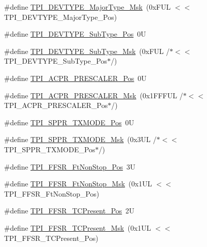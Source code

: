 \begin{DoxyCompactItemize}
\item 
\#define \hyperlink{group___c_m_s_i_s___t_p_i_gaecbceed6d08ec586403b37ad47b38c88}{T\+P\+I\+\_\+\+D\+E\+V\+T\+Y\+P\+E\+\_\+\+Major\+Type\+\_\+\+Msk}~(0x\+F\+U\+L $<$$<$ T\+P\+I\+\_\+\+D\+E\+V\+T\+Y\+P\+E\+\_\+\+Major\+Type\+\_\+\+Pos)
\item 
\#define \hyperlink{group___c_m_s_i_s___t_p_i_ga0c799ff892af5eb3162d152abc00af7a}{T\+P\+I\+\_\+\+D\+E\+V\+T\+Y\+P\+E\+\_\+\+Sub\+Type\+\_\+\+Pos}~0U
\item 
\#define \hyperlink{group___c_m_s_i_s___t_p_i_ga5b2fd7dddaf5f64855d9c0696acd65c1}{T\+P\+I\+\_\+\+D\+E\+V\+T\+Y\+P\+E\+\_\+\+Sub\+Type\+\_\+\+Msk}~(0x\+F\+U\+L /$\ast$$<$$<$ T\+P\+I\+\_\+\+D\+E\+V\+T\+Y\+P\+E\+\_\+\+Sub\+Type\+\_\+\+Pos$\ast$/)
\item 
\#define \hyperlink{group___c_m_s_i_s___t_p_i_ga5a82d274eb2df8b0c92dd4ed63535928}{T\+P\+I\+\_\+\+A\+C\+P\+R\+\_\+\+P\+R\+E\+S\+C\+A\+L\+E\+R\+\_\+\+Pos}~0U
\item 
\#define \hyperlink{group___c_m_s_i_s___t_p_i_ga4fcacd27208419929921aec8457a8c13}{T\+P\+I\+\_\+\+A\+C\+P\+R\+\_\+\+P\+R\+E\+S\+C\+A\+L\+E\+R\+\_\+\+Msk}~(0x1\+F\+F\+F\+U\+L /$\ast$$<$$<$ T\+P\+I\+\_\+\+A\+C\+P\+R\+\_\+\+P\+R\+E\+S\+C\+A\+L\+E\+R\+\_\+\+Pos$\ast$/)
\item 
\#define \hyperlink{group___c_m_s_i_s___t_p_i_ga0f302797b94bb2da24052082ab630858}{T\+P\+I\+\_\+\+S\+P\+P\+R\+\_\+\+T\+X\+M\+O\+D\+E\+\_\+\+Pos}~0U
\item 
\#define \hyperlink{group___c_m_s_i_s___t_p_i_gaca085c8a954393d70dbd7240bb02cc1f}{T\+P\+I\+\_\+\+S\+P\+P\+R\+\_\+\+T\+X\+M\+O\+D\+E\+\_\+\+Msk}~(0x3\+U\+L /$\ast$$<$$<$ T\+P\+I\+\_\+\+S\+P\+P\+R\+\_\+\+T\+X\+M\+O\+D\+E\+\_\+\+Pos$\ast$/)
\item 
\#define \hyperlink{group___c_m_s_i_s___t_p_i_ga9537b8a660cc8803f57cbbee320b2fc8}{T\+P\+I\+\_\+\+F\+F\+S\+R\+\_\+\+Ft\+Non\+Stop\+\_\+\+Pos}~3U
\item 
\#define \hyperlink{group___c_m_s_i_s___t_p_i_gaaa313f980974a8cfc7dac68c4d805ab1}{T\+P\+I\+\_\+\+F\+F\+S\+R\+\_\+\+Ft\+Non\+Stop\+\_\+\+Msk}~(0x1\+U\+L $<$$<$ T\+P\+I\+\_\+\+F\+F\+S\+R\+\_\+\+Ft\+Non\+Stop\+\_\+\+Pos)
\item 
\#define \hyperlink{group___c_m_s_i_s___t_p_i_gad30fde0c058da2ffb2b0a213be7a1b5c}{T\+P\+I\+\_\+\+F\+F\+S\+R\+\_\+\+T\+C\+Present\+\_\+\+Pos}~2U
\item 
\#define \hyperlink{group___c_m_s_i_s___t_p_i_ga0d6bfd263ff2fdec72d6ec9415fb1135}{T\+P\+I\+\_\+\+F\+F\+S\+R\+\_\+\+T\+C\+Present\+\_\+\+Msk}~(0x1\+U\+L $<$$<$ T\+P\+I\+\_\+\+F\+F\+S\+R\+\_\+\+T\+C\+Present\+\_\+\+Pos)
$$
\end{DoxyCompactItemize}
